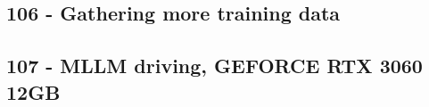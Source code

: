 \subsection{106 - Gathering more training data}
\label{app_res:106}




\subsection{107 - MLLM driving, GEFORCE RTX 3060 12GB}
\label{app_res:107}

